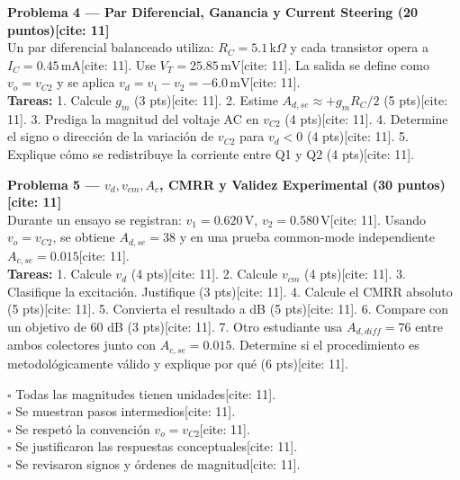 \documentclass[11pt, a4paper]{article}
\begin{document}
\noindent \textbf{Problema 4 — Par Diferencial, Ganancia y Current Steering (20 puntos)[cite: 11]} \\
Un par diferencial balanceado utiliza: $R_C=5.1\,\text{k}\Omega$ y cada transistor opera a $I_C=0.45\,\text{mA}$[cite: 11]. Use $V_T=25.85\,\text{mV}$[cite: 11]. La salida se define como $v_o=v_{C2}$ y se aplica $v_d = v_1 - v_2 = -6.0\,\text{mV}$[cite: 11]. \\
\textbf{Tareas:}
1. Calcule $g_m$ (3 pts)[cite: 11].
2. Estime $A_{d,se} \approx +g_m R_C / 2$ (5 pts)[cite: 11].
3. Prediga la magnitud del voltaje AC en $v_{C2}$ (4 pts)[cite: 11].
4. Determine el signo o dirección de la variación de $v_{C2}$ para $v_d < 0$ (4 pts)[cite: 11].
5. Explique cómo se redistribuye la corriente entre Q1 y Q2 (4 pts)[cite: 11].

\noindent \textbf{Problema 5 — $v_d, v_{cm}, A_c$, CMRR y Validez Experimental (30 puntos)[cite: 11]} \\
Durante un ensayo se registran: $v_1=0.620\,\text{V}$, $v_2=0.580\,\text{V}$[cite: 11]. Usando $v_o=v_{C2}$, se obtiene $A_{d,se}=38$ y en una prueba common-mode independiente $A_{c,se}=0.015$[cite: 11]. \\
\textbf{Tareas:}
1. Calcule $v_d$ (4 pts)[cite: 11].
2. Calcule $v_{cm}$ (4 pts)[cite: 11].
3. Clasifique la excitación. Justifique (3 pts)[cite: 11].
4. Calcule el CMRR absoluto (5 pts)[cite: 11].
5. Convierta el resultado a dB (5 pts)[cite: 11].
6. Compare con un objetivo de 60 dB (3 pts)[cite: 11].
7. Otro estudiante usa $A_{d,diff}=76$ entre ambos colectores junto con $A_{c,se}=0.015$. Determine si el procedimiento es metodológicamente válido y explique por qué (6 pts)[cite: 11].

\begin{tcolorbox}[colback=white, colframe=black, title=\textbf{Checklist Final del Estudiante}]
    $\square$ Todas las magnitudes tienen unidades[cite: 11]. \\
    $\square$ Se muestran pasos intermedios[cite: 11]. \\
    $\square$ Se respetó la convención $v_o = v_{C2}$[cite: 11]. \\
    $\square$ Se justificaron las respuestas conceptuales[cite: 11]. \\
    $\square$ Se revisaron signos y órdenes de magnitud[cite: 11].
\end{tcolorbox}
\end{document}

